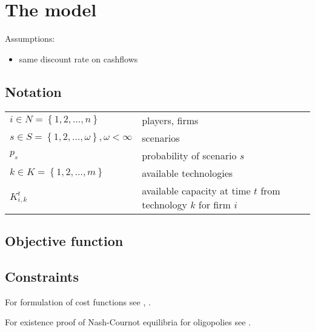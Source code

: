 \section{The model}

Assumptions:

\begin{itemize}
	\item same discount rate on cashflows
\end{itemize}

\subsection{Notation}

\begin{longtable}[c]{l l}
$i\in N=\left\{ 1,2,\dots,n\right\}$ & players, firms\\
$s\in S=\left\{ 1,2,\dots,\omega\right\}, \omega<\infty$ & scenarios\\
$p_s$ & probability of scenario $s$\\
$k\in K=\left\{ 1,2,\dots,m\right\}$ & available technologies\\
$K_{i,k}^t$ & available capacity at time $t$ from technology $k$ for firm $i$\\
 
\end{longtable}

\subsection{Objective function}

\subsection{Constraints}

For formulation of cost functions see \cite{Bergman1995}, \cite{Pineau2003}.	

For existence proof of Nash-Cournot equilibria for oligopolies see \cite{Murphy1982}.



